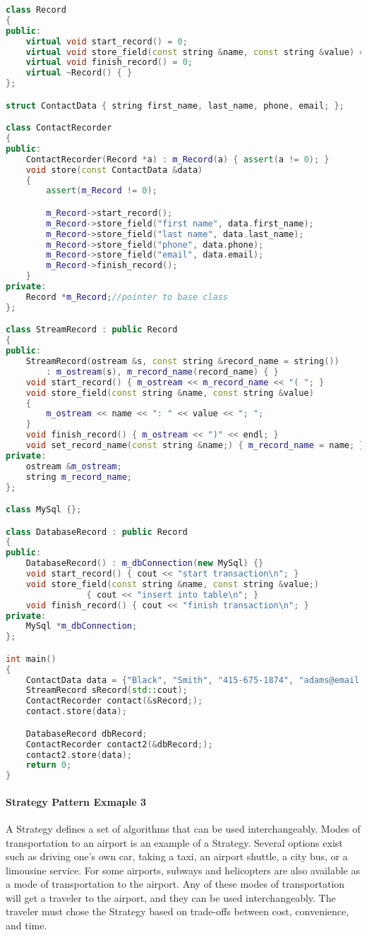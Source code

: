 \documentclass{book}
\begin{document}
\begin{lstlisting}[caption={Strategy Pattern Sample 2}, language=C++]
class Record
{
public:
    virtual void start_record() = 0;
    virtual void store_field(const string &name, const string &value) = 0;
    virtual void finish_record() = 0;
    virtual ~Record() { }
};

struct ContactData { string first_name, last_name, phone, email; };

class ContactRecorder
{
public:
    ContactRecorder(Record *a) : m_Record(a) { assert(a != 0); }
    void store(const ContactData &data)
    {
        assert(m_Record != 0);

        m_Record->start_record();
        m_Record->store_field("first name", data.first_name);
        m_Record->store_field("last name", data.last_name);
        m_Record->store_field("phone", data.phone);
        m_Record->store_field("email", data.email);
        m_Record->finish_record();
    }
private:
    Record *m_Record;//pointer to base class
};

class StreamRecord : public Record
{
public:
    StreamRecord(ostream &s, const string &record_name = string())
        : m_ostream(s), m_record_name(record_name) { } 
    void start_record() { m_ostream << m_record_name << "( "; }
    void store_field(const string &name, const string &value)
    {
        m_ostream << name << ": " << value << "; ";
    }
    void finish_record() { m_ostream << ")" << endl; }
    void set_record_name(const string &name;) { m_record_name = name; }
private:
    ostream &m_ostream;
    string m_record_name;
};

class MySql {};

class DatabaseRecord : public Record
{
public:
    DatabaseRecord() : m_dbConnection(new MySql) {}
    void start_record() { cout << "start transaction\n"; }
    void store_field(const string &name, const string &value;)
                { cout << "insert into table\n"; }
    void finish_record() { cout << "finish transaction\n"; }
private:
    MySql *m_dbConnection;
};

int main()
{
	ContactData data = {"Black", "Smith", "415-675-1874", "adams@email.com"};
	StreamRecord sRecord(std::cout);
	ContactRecorder contact(&sRecord;);
	contact.store(data);

	DatabaseRecord dbRecord;
	ContactRecorder contact2(&dbRecord;);
	contact2.store(data);
	return 0;
}
\end{lstlisting}


\paragraph{Strategy Pattern Exmaple 3}
A Strategy defines a set of algorithms that can be used interchangeably.
Modes of transportation to an airport is an example of a Strategy.
Several options exist such as driving one's own car, taking a taxi, an airport shuttle, a city bus, or a limousine service.
For some airports, subways and helicopters are also available as a mode of transportation to the airport.
Any of these modes of transportation will get a traveler to the airport, and they can be used interchangeably.
The traveler must chose the Strategy based on trade-offs between cost, convenience, and time.
\end{document}
